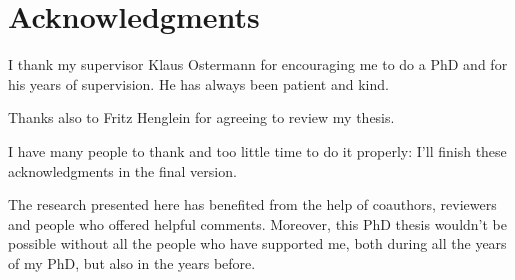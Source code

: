 
\chapter{Acknowledgments}
I thank my supervisor Klaus Ostermann for encouraging me to do a PhD
and for his years of supervision. He has always been patient and kind.

Thanks also to Fritz Henglein for agreeing to review my thesis.

I have many people to thank and too little time to do it properly: I'll finish
these acknowledgments in the final version.

The research presented here has benefited from the help of coauthors,
reviewers and people who offered helpful comments.
Moreover, this PhD thesis wouldn't be possible without all the people who have
supported me, both during all the years of my PhD, but also in the years before.



